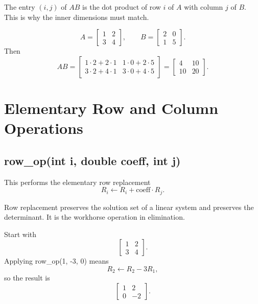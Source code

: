 \documentclass[11pt,a4paper,openany]{book}
\def\code#1{#1}%
\DeclareRobustCommand{\code}[1]{\texttt{\detokenize{#1}}}
\begin{document}
\begin{mathbox}[Interpretation]
The entry \((i,j)\) of \(AB\) is the dot product of row \(i\) of \(A\) with column \(j\) of \(B\). This is why the inner dimensions must match.
\end{mathbox}

\begin{examplebox}[Example]
\[
A =
\begin{bmatrix}
1 & 2 \\
3 & 4
\end{bmatrix},
\qquad
B =
\begin{bmatrix}
2 & 0 \\
1 & 5
\end{bmatrix}.
\]
Then
\[
AB =
\begin{bmatrix}
1\cdot2 + 2\cdot1 & 1\cdot0 + 2\cdot5 \\
3\cdot2 + 4\cdot1 & 3\cdot0 + 4\cdot5
\end{bmatrix}
=
\begin{bmatrix}
4 & 10 \\
10 & 20
\end{bmatrix}.
\]
\end{examplebox}

\chapter{Elementary Row and Column Operations}

\section{\code{row_op(int i, double coeff, int j)}}
This performs the elementary row replacement
\[
R_i \leftarrow R_i + \text{coeff} \cdot R_j.
\]

\begin{mathbox}
Row replacement preserves the solution set of a linear system and preserves the determinant. It is the workhorse operation in elimination.
\end{mathbox}

\begin{examplebox}[Example]
Start with
\[
\begin{bmatrix}
1 & 2 \\
3 & 4
\end{bmatrix}.
\]
Applying \code{row_op(1, -3, 0)} means
\[
R_2 \leftarrow R_2 - 3R_1,
\]
so the result is
\[
\begin{bmatrix}
1 & 2 \\
0 & -2
\end{bmatrix}.
\]
\end{examplebox}
\end{document}
